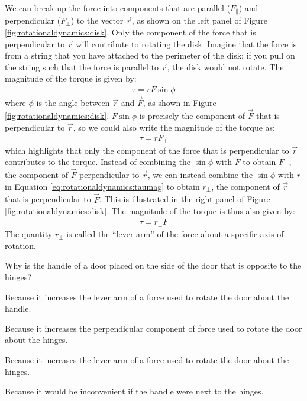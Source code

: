 We can break up the force into components that are parallel ($F_\parallel$) and perpendicular ($F_\perp$) to the vector $\vec r$, as shown on the left panel of Figure \ref{fig:rotationaldynamics:disk}. Only the component of the force that is perpendicular to $\vec r$ will contribute to rotating the disk. Imagine that the force is from a string that you have attached to the perimeter of the disk; if you pull on the string such that the force is parallel to $\vec r$, the disk would not rotate. The magnitude of the torque is given by:
\begin{align}
\label{eq:rotationaldynamics:taumag}
\tau = rF\sin\phi
\end{align}
where $\phi$ is the angle between $\vec r$ and $\vec F$, as shown in Figure \ref{fig:rotationaldynamics:disk}. $F \sin \phi$ is precisely the component of $\vec F$ that is perpendicular to $\vec r$, so we could also write the magnitude of the torque as:
\begin{align*}
\tau =rF_\perp
\end{align*}
which highlights that only the component of the force that is perpendicular to $\vec r$ contributes to the torque. Instead of combining the $\sin \phi$ with $F$ to obtain $F_\perp$, the component of $\vec F$ perpendicular to $\vec r$, we can instead combine the $\sin \phi$ with $r$ in Equation \ref{eq:rotationaldynamics:taumag} to obtain $r_\perp$, the component of $\vec r$ that is perpendicular to $\vec F$. This is illustrated in the right panel of Figure \ref{fig:rotationaldynamics:disk}. The magnitude of the torque is thus also given by:
\begin{align*}
\tau =r_\perp F
\end{align*}
The quantity $r_\perp$ is called the ``lever arm'' of the force about a specific axis of rotation. 

\begin{checkpoint}\label{cp:rotationaldynamics:door}
\begin{MCquestion}{Why is the handle of a door placed on the side of the door that is opposite to the hinges?}
\item Because it increases the lever arm of a force used to rotate the door about the handle.
\item Because it increases the perpendicular component of force used to rotate the door about the hinges.
\item \label{correct:rotationaldynamics:door}  Because it increases the lever arm of a force used to rotate the door about the hinges.
\item Because it would be inconvenient if the handle were next to the hinges.
\end{MCquestion}
\end{checkpoint}

